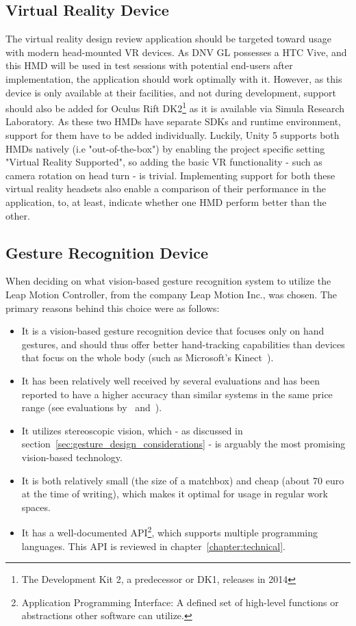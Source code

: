 \subsection{Virtual Reality Device}
The virtual reality design review application should be targeted toward usage with modern head-mounted VR devices.
As DNV GL possesses a HTC Vive, and this HMD will be used in test sessions with potential end-users after implementation, 
the application should work optimally with it. However, as this device is only available at their facilities, and not during development, support 
should also be added for Oculus Rift DK2\footnote{The Development Kit 2, a predecessor or DK1, releases in 2014} as it is available via Simula Research Laboratory.
As these two HMDs have separate SDKs and runtime environment, support for them have to be added individually. 
Luckily, Unity 5 supports both HMDs natively (i.e "out-of-the-box") by enabling the project specific setting "Virtual Reality Supported", 
so adding the basic VR functionality - such as camera rotation on head turn - is trivial. 
Implementing support for both these virtual reality headsets also enable a comparison of their performance in the application, to, at least, indicate whether 
one HMD perform better than the other. 

\subsection{Gesture Recognition Device}
\label{sec:design_leapmotion}
When deciding on what vision-based gesture recognition system to utilize the Leap Motion Controller, from the company Leap Motion Inc., was chosen.
The primary reasons behind this choice were as follows: 
\begin{itemize}
    \item It is a vision-based gesture recognition device that focuses only on hand gestures, and should thus offer better hand-tracking capabilities than devices that focus 
          on the whole body (such as Microsoft's Kinect~\citep{Zhang2012}).
    \item It has been relatively well received by several evaluations and has been reported to have a higher accuracy than similar systems in the same price range
            (see evaluations by~\citet{Weichert2013} and~\citet{Guna2014}).
    \item It utilizes stereoscopic vision, which - as discussed in section~\vref{sec:gesture_design_considerations} - is arguably the most promising vision-based technology.
    \item It is both relatively small (the size of a matchbox) and cheap (about 70 euro at the time of writing), which makes it optimal for usage in regular work spaces. 
    \item It has a well-documented API\footnote{Application Programming Interface: A defined set of high-level functions or abstractions other software can utilize.}, which 
          supports multiple programming languages. This API is reviewed in chapter~\ref{chapter:technical}.
\end{itemize}

